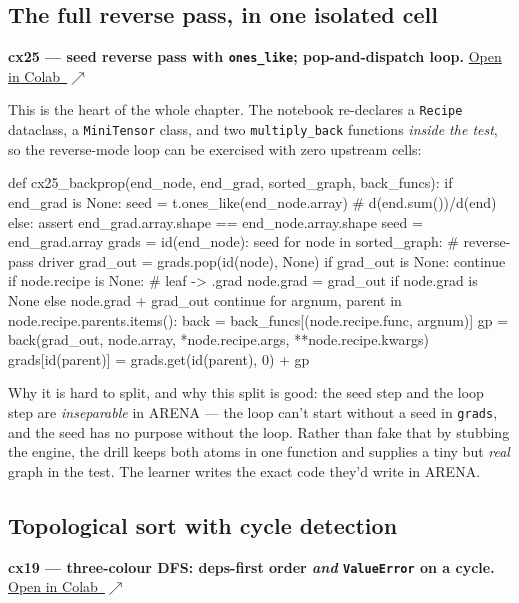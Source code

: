\documentclass[11pt]{article}
\newcommand{\colab}[1]{\href{https://colab.research.google.com/github/AkiraTheSquid/Delta-Drills/blob/main/arena-procedural-drills/#1}{Open in Colab \,$\nearrow$}}
\begin{document}
\subsection{The full reverse pass, in one isolated cell}
\textbf{cx25 --- seed reverse pass with \texttt{ones\_like}; pop-and-dispatch loop.} \;\colab{composites/part4/025-end-grad-seeded-backprop-loop.ipynb}

This is the heart of the whole chapter. The notebook re-declares a \verb|Recipe| dataclass, a
\verb|MiniTensor| class, and two \verb|multiply_back| functions \emph{inside the test}, so the
reverse-mode loop can be exercised with zero upstream cells:

\begin{code}
def cx25_backprop(end_node, end_grad, sorted_graph, back_funcs):
    if end_grad is None:
        seed = t.ones_like(end_node.array)          # d(end.sum())/d(end)
    else:
        assert end_grad.array.shape == end_node.array.shape
        seed = end_grad.array
    grads = {id(end_node): seed}
    for node in sorted_graph:                        # reverse-pass driver
        grad_out = grads.pop(id(node), None)
        if grad_out is None: continue
        if node.recipe is None:                      # leaf -> .grad
            node.grad = grad_out if node.grad is None else node.grad + grad_out
            continue
        for argnum, parent in node.recipe.parents.items():
            back = back_funcs[(node.recipe.func, argnum)]
            gp = back(grad_out, node.array, *node.recipe.args, **node.recipe.kwargs)
            grads[id(parent)] = grads.get(id(parent), 0) + gp
\end{code}

Why it is hard to split, and why this split is good: the seed step and the loop step are
\emph{inseparable} in ARENA --- the loop can't start without a seed in \texttt{grads}, and the
seed has no purpose without the loop. Rather than fake that by stubbing the engine, the drill
keeps both atoms in one function and supplies a tiny but \emph{real} graph in the test. The
learner writes the exact code they'd write in ARENA.

\subsection{Topological sort with cycle detection}
\textbf{cx19 --- three-colour DFS: deps-first order \emph{and} \texttt{ValueError} on a cycle.} \;\colab{composites/part4/019-dfs-toposort-with-temp-set-cycle-detection.ipynb}
\end{document}
